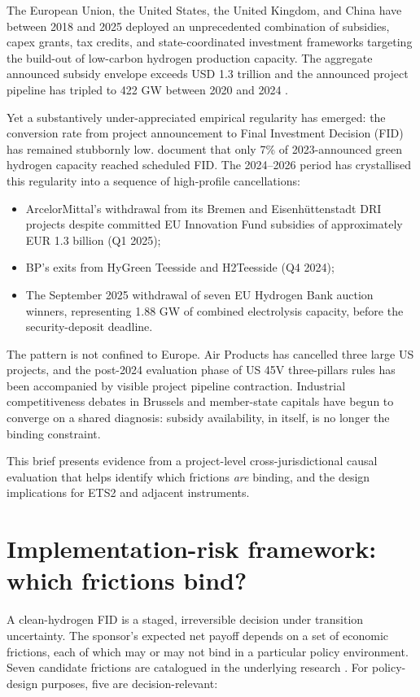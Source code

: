 \documentclass[11pt,a4paper]{article}
\begin{document}
The European Union, the United States, the United Kingdom, and China have between 2018 and 2025 deployed an unprecedented combination of subsidies, capex grants, tax credits, and state-coordinated investment frameworks targeting the build-out of low-carbon hydrogen production capacity. The aggregate announced subsidy envelope exceeds USD 1.3 trillion and the announced project pipeline has tripled to 422 GW between 2020 and 2024 \cite{odenweller2025green}.

Yet a substantively under-appreciated empirical regularity has emerged: the conversion rate from project announcement to Final Investment Decision (FID) has remained stubbornly low. \cite{odenweller2025green} document that only 7\% of 2023-announced green hydrogen capacity reached scheduled FID. The 2024--2026 period has crystallised this regularity into a sequence of high-profile cancellations:

\begin{itemize}
\item ArcelorMittal's withdrawal from its Bremen and Eisenhüttenstadt DRI projects despite committed EU Innovation Fund subsidies of approximately EUR 1.3 billion (Q1 2025);
\item BP's exits from HyGreen Teesside and H2Teesside (Q4 2024);
\item The September 2025 withdrawal of seven EU Hydrogen Bank auction winners, representing 1.88 GW of combined electrolysis capacity, before the security-deposit deadline.
\end{itemize}

The pattern is not confined to Europe. Air Products has cancelled three large US projects, and the post-2024 evaluation phase of US 45V three-pillars rules has been accompanied by visible project pipeline contraction. Industrial competitiveness debates in Brussels and member-state capitals have begun to converge on a shared diagnosis: subsidy availability, in itself, is no longer the binding constraint.

This brief presents evidence from a project-level cross-jurisdictional causal evaluation that helps identify which frictions \emph{are} binding, and the design implications for ETS2 and adjacent instruments.

\section{Implementation-risk framework: which frictions bind?}

A clean-hydrogen FID is a staged, irreversible decision under transition uncertainty. The sponsor's expected net payoff depends on a set of economic frictions, each of which may or may not bind in a particular policy environment. Seven candidate frictions are catalogued in the underlying research \cite{saakstra2026thesis}. For policy-design purposes, five are decision-relevant:
\end{document}
